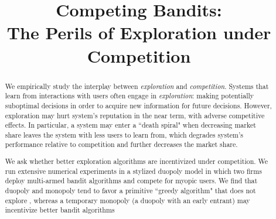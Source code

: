 \documentclass[format=acmsmall, review=false]{acmart}
\theoremstyle{definition}
\begin{document}
\title[Competing Bandits: The Perils of Exploration under Competition]
{Competing Bandits: \\ The Perils of Exploration under Competition}


\begin{abstract}
We empirically study the interplay between \textit{exploration} and \textit{competition}. Systems that learn from interactions with users often engage in \emph{exploration}: making potentially suboptimal decisions in order to acquire new information for future decisions. However, exploration may hurt system's reputation in the near term, with adverse competitive effects. In particular, a system may enter a ``death spiral" when decreasing market share leaves the system with less users to learn from, which degrades system's performance relative to competition and further decreases the market share.

We ask whether better exploration algorithms are incentivized under competition. We run extensive numerical experiments in a stylized duopoly model in which two firms deploy multi-armed bandit algorithms and compete for myopic users.  We find that duopoly and monopoly tend to favor a primitive ``greedy algorithm" that does not explore , whereas a temporary monopoly (a duopoly with an early entrant) may incentivize better bandit algorithms 
\end{abstract}

%
%


\maketitle




















\end{document}

